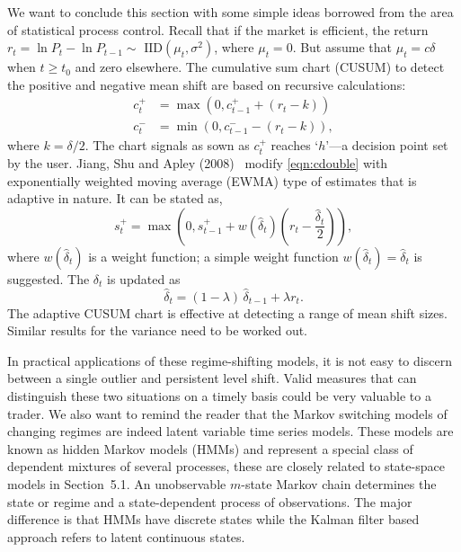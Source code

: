 We want to conclude this section with some simple ideas borrowed from the area of statistical process control. Recall that if the market is efficient, the return $r_t= \ln P_t - \ln P_{t-1} \sim \text{ IID}(\mu_t, \sigma^2)$, where $\mu_t=0$. But assume that $\mu_t=c\delta$ when $t\geq t_0$ and zero elsewhere. The cumulative sum chart (CUSUM) to detect the positive and negative mean shift are based on recursive calculations:
	\begin{equation} \label{eqn:cdouble}
	\begin{split}
	c_t^+&= \max(0, c_{t-1}^+ + (r_t-k)) \\
	c_t^-&= \min(0, c_{t-1}^- - (r_t-k)),
	\end{split}
	\end{equation}
where $k= \delta/2$. The chart signals as sown as $c_t^+$ reaches `$h$'---a decision point set by the user. Jiang, Shu and Apley (2008)~\cite{shuap} modify \eqref{eqn:cdouble} with exponentially weighted moving average (EWMA) type of estimates that is adaptive in nature. It can be stated as,
	\begin{equation}\label{eqn:elma}
	s_t^+= \max \left( 0, s_{t-1}^+ + w(\hat{\delta}_t) \left(r_t - \frac{\hat{\delta}_t}{2} \right) \right),
	\end{equation}
where $w(\hat{\delta}_t)$ is a weight function; a simple weight function $w(\hat{\delta}_t)=\hat{\delta}_t$ is suggested. The $\delta_t$ is updated as 
	\begin{equation}\label{eqn:updatedelt}
	\hat{\delta}_t= (1-\lambda)\, \hat{\delta}_{t-1} + \lambda r_t.
	\end{equation}
The adaptive CUSUM chart is effective at detecting a range of mean shift sizes. Similar results for the variance need to be worked out.


In practical applications of these regime-shifting models, it is not easy to discern between a single outlier and persistent level shift. Valid measures that can distinguish these two situations on a timely basis could be very valuable to a trader. We also want to remind the reader that the Markov switching models of changing regimes are indeed latent variable time series models. These models are known as hidden Markov models (HMMs) and represent a special class of dependent mixtures of several processes, these are closely related to state-space models in Section~5.1. An unobservable $m$-state Markov chain determines the state or regime and a state-dependent process of observations. The major difference is that HMMs have discrete states while the Kalman filter based approach refers to latent continuous states. 



